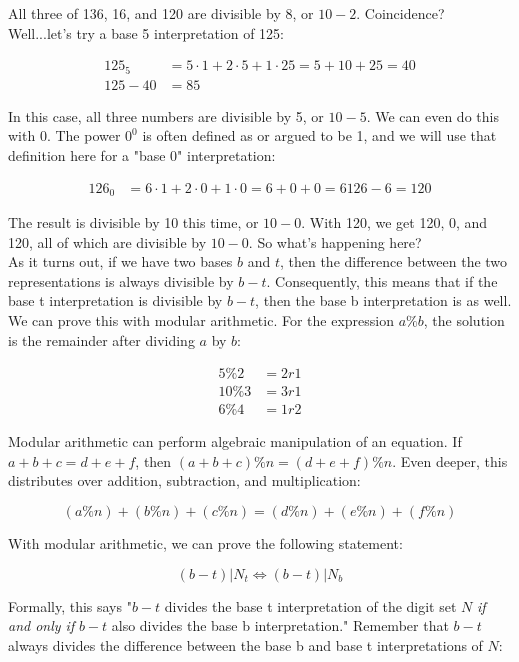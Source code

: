 \documentclass{article}
\begin{document}
\noindent All three of 136, 16, and 120 are divisible by 8, or $10 - 2$. Coincidence? Well...let's try a base 5 interpretation of 125:

\begin{align*}
125_5 &= 5 \cdot 1 + 2 \cdot 5 + 1 \cdot 25 = 5 + 10 + 25 = 40\\
125 - 40 &= 85
\end{align*}

\noindent In this case, all three numbers are divisible by 5, or $10 - 5$. We can even do this with 0. The power $0^0$ is often defined as or argued to be 1, and we will use that definition here for a "base 0" interpretation:

\begin{align*}
126_0 &= 6 \cdot 1 + 2 \cdot 0 + 1 \cdot 0 = 6 + 0 + 0 = 6
126 - 6 = 120
\end{align*}

\noindent The result is divisible by 10 this time, or $10 - 0$. With 120, we get 120, 0, and 120, all of which are divisible by $10 - 0$. So what's happening here?\\

\noindent As it turns out, if we have two bases $b$ and $t$, then the difference between the two representations is always divisible by $b-t$. Consequently, this means that if the base t interpretation is divisible by $b-t$, then the base b interpretation is as well. We can prove this with modular arithmetic. For the expression $a \% b$, the solution is the remainder after dividing $a$ by $b$:

\begin{align*}
5 \% 2 &= 2r1\\
10 \% 3 &= 3r1\\
6 \% 4 &= 1r2
\end{align*}

\noindent Modular arithmetic can perform algebraic manipulation of an equation. If $a + b + c = d + e + f$, then $(a + b + c) \% n = (d + e + f) \% n$. Even deeper, this distributes over addition, subtraction, and multiplication:

$$(a \% n) + (b \% n) + (c \% n) = (d \% n) + (e \% n) + (f \% n)$$

\noindent With modular arithmetic, we can prove the following statement:

$$ (b-t) | N_t \iff (b-t) | N_b$$

\noindent Formally, this says "$b-t$ divides the base t interpretation of the digit set $N$ \textit{if and only if} $b-t$ also divides the base b interpretation." Remember that $b-t$ always divides the difference between the base b and base t interpretations of $N$:
\end{document}

